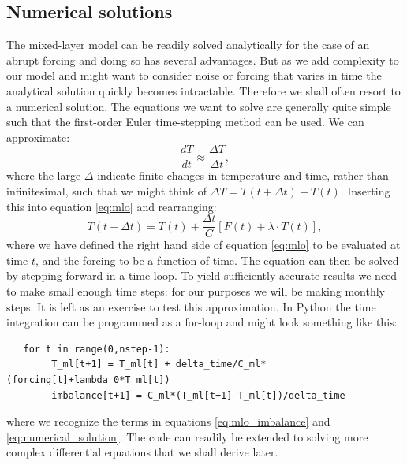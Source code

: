 \documentclass[12pt]{book}
\begin{document}
\subsection{Numerical solutions}
The mixed-layer model can be readily solved analytically for the case of an abrupt forcing and doing so has several advantages. But as we add complexity to our model and might want to consider noise or forcing that varies in time the analytical solution quickly becomes intractable. Therefore we shall often resort to a numerical solution. The equations we want to solve are generally quite simple such that the first-order Euler time-stepping method can be used. We can approximate:
$$ \frac{dT}{dt} \approx \frac{\Delta T}{\Delta t}, $$
where the large $\Delta$ indicate finite changes in temperature and time, rather than infinitesimal, such that we might think of $\Delta T = T(t+\Delta t)-T(t)$. Inserting this into equation \ref{eq:mlo} and rearranging:
\begin{equation}
T(t+\Delta t) = T(t) + \frac{\Delta t}{C} \left[F(t)+\lambda \cdot T(t)\right], 
\label{eq:numerical_solution}
\end{equation}
where we have defined the right hand side of equation \ref{eq:mlo} to be evaluated at time $t$, and the forcing to be a function of time. The equation can then be solved by stepping forward in a time-loop. To yield sufficiently accurate results we need to make small enough time steps: for our purposes we will be making monthly steps.  It is left as an exercise to test this approximation.
In Python the time integration can be programmed as a for-loop and might look something like this:
\begin{verbatim}
   for t in range(0,nstep-1):
        T_ml[t+1] = T_ml[t] + delta_time/C_ml*(forcing[t]+lambda_0*T_ml[t])
        imbalance[t+1] = C_ml*(T_ml[t+1]-T_ml[t])/delta_time
\end{verbatim}
where we recognize the terms in equations \ref{eq:mlo_imbalance} and \ref{eq:numerical_solution}. The code can readily be extended to solving more complex differential equations that we shall derive later.
\end{document}
